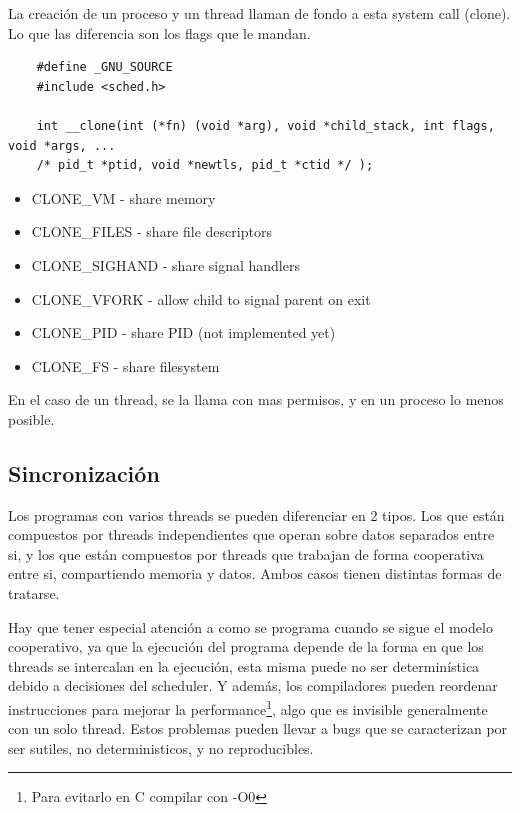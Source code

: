\documentclass[titlepage,a4paper]{article}
\begin{document}
La creación de un proceso y un thread llaman de fondo a esta system call (clone). Lo que las diferencia son los flags que le mandan.
\begin{verbatim}
    #define _GNU_SOURCE
    #include <sched.h>
    
    int __clone(int (*fn) (void *arg), void *child_stack, int flags, void *args, ...
    /* pid_t *ptid, void *newtls, pid_t *ctid */ );
\end{verbatim}

\medskip

\begin{itemize}
    \item CLONE\_VM - share memory
    \item CLONE\_FILES - share file descriptors
    \item CLONE\_SIGHAND - share signal handlers
    \item CLONE\_VFORK - allow child to signal parent on exit
    \item CLONE\_PID - share PID (not implemented yet)
    \item CLONE\_FS - share filesystem
\end{itemize}

En el caso de un thread, se la llama con mas permisos, y en un proceso lo menos posible.



\subsection*{Sincronización}

Los programas con varios threads se pueden diferenciar en 2 tipos. Los que están compuestos por threads independientes que operan sobre datos separados entre si, y los que están compuestos por threads que trabajan de forma cooperativa entre si, compartiendo memoria y datos. Ambos casos tienen distintas formas de tratarse.

Hay que tener especial atención a como se programa cuando se sigue el modelo cooperativo, ya que la ejecución del programa depende de la forma en que los threads se intercalan en la ejecución, esta misma puede no ser determinística debido a decisiones del scheduler. Y además, los compiladores pueden reordenar instrucciones para mejorar la performance\footnote{Para evitarlo en C compilar con -O0}, algo que es invisible generalmente con un solo thread. Estos problemas pueden llevar a bugs que se caracterizan por ser sutiles, no deterministicos, y no reproducibles.
\end{document}
